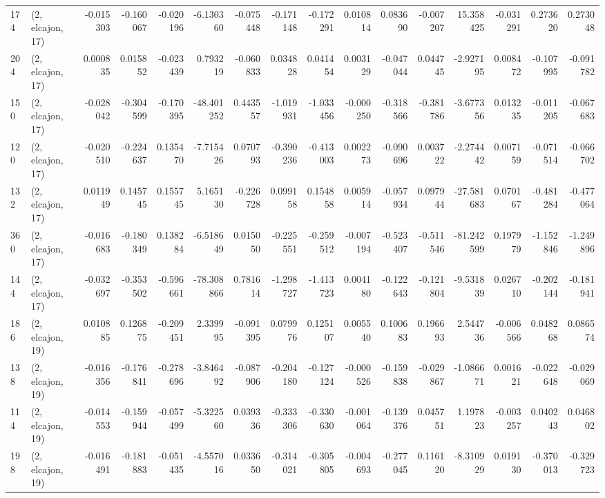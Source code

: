 \begin{tabular}{llrrrrrrrrrrrrrr}
174 &  (2, elcajon, 17) &  -0.015303 & -0.160067 & -0.020196 &   -6.130360 & -0.075448 &  -0.171148 & -0.172291 &  0.010814 &  0.083690 & -0.007207 &    15.358425 & -0.031291 &  0.273620 &  0.273048 \\
204 &  (2, elcajon, 17) &   0.000835 &  0.015852 & -0.023439 &    0.793219 & -0.060833 &   0.034828 &  0.041454 &  0.003129 & -0.047044 &  0.044745 &    -2.927195 &  0.008472 & -0.107995 & -0.091782 \\
150 &  (2, elcajon, 17) &  -0.028042 & -0.304599 & -0.170395 &  -48.401252 &  0.443557 &  -1.019931 & -1.033456 & -0.000250 & -0.318566 & -0.381786 &    -3.677356 &  0.013235 & -0.011205 & -0.067683 \\
120 &  (2, elcajon, 17) &  -0.020510 & -0.224637 &  0.135470 &   -7.715426 &  0.070793 &  -0.390236 & -0.413003 &  0.002273 & -0.090696 &  0.003722 &    -2.274442 &  0.007159 & -0.071514 & -0.066702 \\
132 &  (2, elcajon, 17) &   0.011949 &  0.145745 &  0.155745 &    5.165130 & -0.226728 &   0.099158 &  0.154858 &  0.005914 & -0.057934 &  0.097944 &   -27.581683 &  0.070167 & -0.481284 & -0.477064 \\
360 &  (2, elcajon, 17) &  -0.016683 & -0.180349 &  0.138284 &   -6.518649 &  0.015050 &  -0.225551 & -0.259512 & -0.007194 & -0.523407 & -0.511546 &   -81.242599 &  0.197979 & -1.152846 & -1.249896 \\
144 &  (2, elcajon, 17) &  -0.032697 & -0.353502 & -0.596661 &  -78.308866 &  0.781614 &  -1.298727 & -1.413723 &  0.004180 & -0.122643 & -0.121804 &    -9.531839 &  0.026710 & -0.202144 & -0.181941 \\
186 &  (2, elcajon, 19) &   0.010885 &  0.126875 & -0.209451 &    2.339995 & -0.091395 &   0.079976 &  0.125107 &  0.005540 &  0.100683 &  0.196693 &     2.544736 & -0.006566 &  0.048268 &  0.086574 \\
138 &  (2, elcajon, 19) &  -0.016356 & -0.176841 & -0.278696 &   -3.846492 & -0.087906 &  -0.204180 & -0.127124 & -0.000526 & -0.159838 & -0.029867 &    -1.086671 &  0.001621 & -0.022648 & -0.029069 \\
114 &  (2, elcajon, 19) &  -0.014553 & -0.159944 & -0.057499 &   -5.322560 &  0.039336 &  -0.333306 & -0.330630 & -0.001064 & -0.139376 &  0.045751 &     1.197823 & -0.003257 &  0.040243 &  0.046802 \\
198 &  (2, elcajon, 19) &  -0.016491 & -0.181883 & -0.051435 &   -4.557016 &  0.033650 &  -0.314021 & -0.305805 & -0.004693 & -0.277045 &  0.116120 &    -8.310929 &  0.019130 & -0.370013 & -0.329723 \\

\end{tabular}
